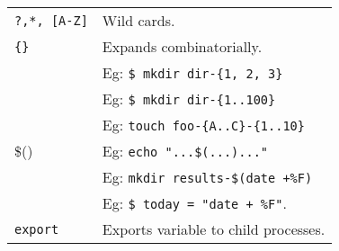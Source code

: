 \begin{tabularx}{\linewidth}{lX}
    \texttt{?,*, [A-Z]}         & Wild cards.\\
    \texttt{\{\}}               & Expands combinatorially.\\ 
                                &  Eg: \texttt{\$ mkdir dir-\{1, 2, 3\}}\\
                                &  Eg: \texttt{\$ mkdir dir-\{1..100\}}\\
                                &  Eg: \texttt{touch foo-\{A..C\}-\{1..10\}}\\
    \$()                        & Eg: \texttt{echo "...\$(...)..."}\\
                                & Eg: \texttt{mkdir results-\$(date +\%F)}\\
                                & Eg: \texttt{\$ today = "date + \%F"}. \\
    \hline

    \texttt{export}          &  Exports variable to child processes.\\
\end{tabularx}


\vfill\null
\columnbreak